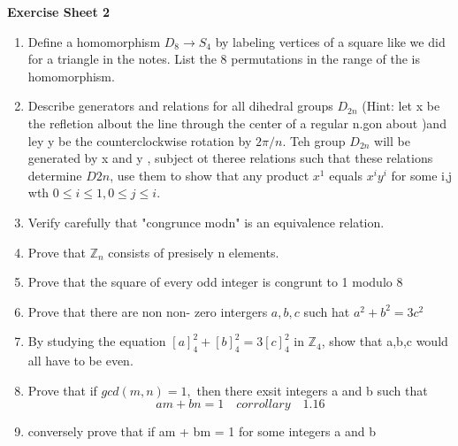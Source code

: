 \textbf{Exercise Sheet 2}
\begin{enumerate}
    \item Define a homomorphism $D_8 \to S_4$ by labeling vertices of a square like we did for a triangle in the notes. List the 8 permutations in the range of the is homomorphism.
    \item Describe generators and relations for all dihedral groups $D_{2n}$ (Hint: let x be the refletion albout the line through the center of a regular n.gon about )and ley y be the counterclockwise rotation by $2\pi/n$. Teh group $D_{2n}$ will  be generated by x and y , subject ot theree relations such that these relations determine $D{2n}$, use them to show that any product
    $x^1$ equals $x^iy^i$ for some i,j wth $0 \le i \le 1, 0 \le j \le i$.
    \item Verify carefully that "congrunce modn" is an equivalence relation.
    \item Prove that $\mathbb{Z}_n$ consists of presisely n elements.
    \item Prove that the square of every odd integer is congrunt to 1 modulo 8
    \item Prove that there are non non- zero intergers $a,b,c$ such hat $a^2 + b^2 = 3c^2$
    \item By studying the equation $[a]_4^2 + [b]_4^2 = 3[c]_4^2$ in $\mathbb{Z}_4$, show that a,b,c would all have to be even.
    \item Prove that if $gcd(m,n) = 1,$ then there exsit integers a and b such that
    $$am + bn = 1 \quad corrollary \quad 1.16$$
    \item  conversely prove that if am + bm = 1 for some integers a and b
\end{enumerate}
